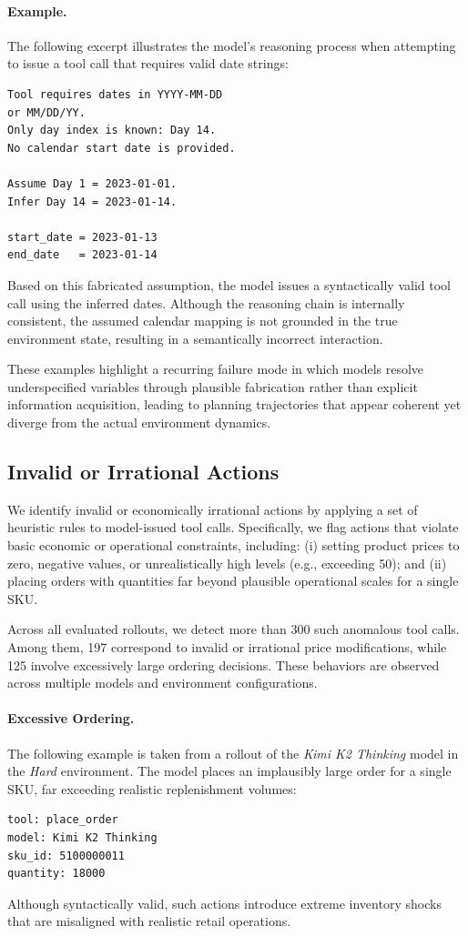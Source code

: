\paragraph{Example.}
The following excerpt illustrates the model’s reasoning process when attempting to issue a tool call that requires valid date strings:
\begin{verbatim}
Tool requires dates in YYYY-MM-DD 
or MM/DD/YY.
Only day index is known: Day 14.
No calendar start date is provided.

Assume Day 1 = 2023-01-01.
Infer Day 14 = 2023-01-14.

start_date = 2023-01-13
end_date   = 2023-01-14
\end{verbatim}

Based on this fabricated assumption, the model issues a syntactically valid tool call using the inferred dates. Although the reasoning chain is internally consistent, the assumed calendar mapping is not grounded in the true environment state, resulting in a semantically incorrect interaction.

These examples highlight a recurring failure mode in which models resolve underspecified variables through plausible fabrication rather than explicit information acquisition, leading to planning trajectories that appear coherent yet diverge from the actual environment dynamics.
\subsection{Invalid or Irrational Actions}
\label{appendix:invalid_action}

We identify invalid or economically irrational actions by applying a set of heuristic rules to model-issued tool calls. Specifically, we flag actions that violate basic economic or operational constraints, including: (i) setting product prices to zero, negative values, or unrealistically high levels (e.g., exceeding 50); and (ii) placing orders with quantities far beyond plausible operational scales for a single SKU.

Across all evaluated rollouts, we detect more than 300 such anomalous tool calls. Among them, 197 correspond to invalid or irrational price modifications, while 125 involve excessively large ordering decisions. These behaviors are observed across multiple models and environment configurations.

\paragraph{Excessive Ordering.}
The following example is taken from a rollout of the \textit{Kimi K2 Thinking} model in the \textit{Hard} environment. The model places an implausibly large order for a single SKU, far exceeding realistic replenishment volumes:
\begin{verbatim}
tool: place_order
model: Kimi K2 Thinking
sku_id: 5100000011
quantity: 18000
\end{verbatim}
Although syntactically valid, such actions introduce extreme inventory shocks that are misaligned with realistic retail operations.

